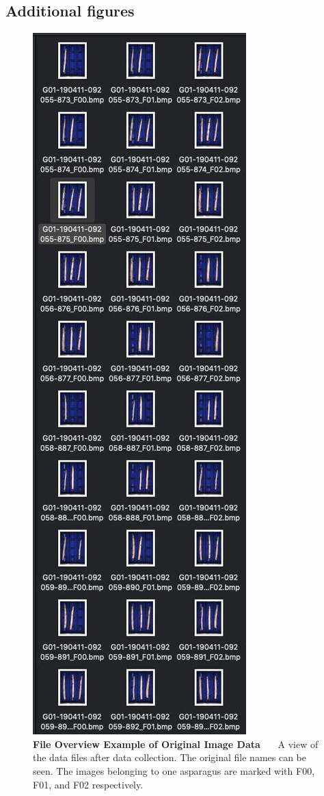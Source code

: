 \subsection{Additional figures}
\label{sec:AddFigures}

\begin{figure}[h]
	\centering
	\includegraphics[scale=0.4]{Figures/appendix/original_files_naming_conventions.png}
	\decoRule
	\caption[File Overview Example of Original Image Data]{\textbf{File Overview Example of Original Image Data}~~~ A view of the data files after data collection. The original file names can be seen. The images belonging to one asparagus are marked with F00, F01, and F02 respectively.}
	\label{fig:Original_Data_Overview}
\end{figure}

